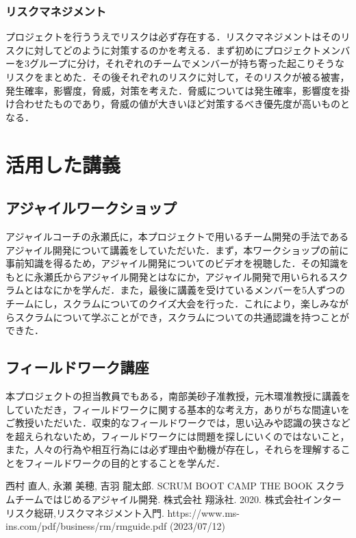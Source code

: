 \documentclass[openany,11pt,papersize,dvipdfm]{jsbook}
\begin{document}
\begin{appendix}
\subsection{リスクマネジメント}
プロジェクトを行ううえでリスクは必ず存在する．リスクマネジメント\cite{risk}はそのリスクに対してどのように対策するのかを考える．まず初めにプロジェクトメンバーを3グループに分け，それぞれのチームでメンバーが持ち寄った起こりそうなリスクをまとめた．その後それぞれのリスクに対して，そのリスクが被る被害，発生確率，影響度，脅威，対策を考えた．脅威については発生確率，影響度を掛け合わせたものであり，脅威の値が大きいほど対策するべき優先度が高いものとなる．

\chapter{活用した講義}
\section{アジャイルワークショップ}
アジャイルコーチの永瀬氏に，本プロジェクトで用いるチーム開発の手法であるアジャイル開発について講義をしていただいた．まず，本ワークショップの前に事前知識を得るため，アジャイル開発についてのビデオを視聴した．その知識をもとに永瀬氏からアジャイル開発とはなにか，アジャイル開発で用いられるスクラムとはなにかを学んだ．また，最後に講義を受けているメンバーを5人ずつのチームにし，スクラムについてのクイズ大会を行った．これにより，楽しみながらスクラムについて学ぶことができ，スクラムについての共通認識を持つことができた．

\section{フィールドワーク講座}
本プロジェクトの担当教員でもある，南部美砂子准教授，元木環准教授に講義をしていただき，フィールドワークに関する基本的な考え方，ありがちな間違いをご教授いただいた．収束的なフィールドワークでは，思い込みや認識の狭さなどを超えられないため，フィールドワークには問題を探しにいくのではないこと，また，人々の行為や相互行為には必ず理由や動機が存在し，それらを理解することをフィールドワークの目的とすることを学んだ．

\end{appendix}

\begin{thebibliography}{9}
     西村 直人, 永瀬 美穂, 吉羽 龍太郎. SCRUM BOOT CAMP THE BOOK スクラムチームではじめるアジャイル開発. 株式会社 翔泳社. 2020.
     株式会社インターリスク総研,リスクマネジメント入門. https://www.ms-ins.com/pdf/business/rm/rmguide.pdf (2023/07/12)
\end{thebibliography}
\end{document}
